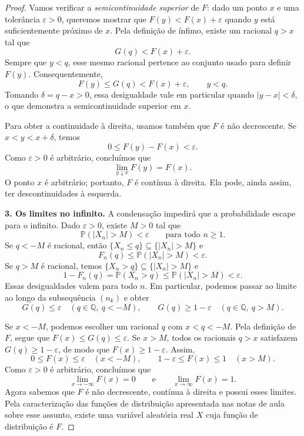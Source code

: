 \documentclass[12pt,portuguese]{article}
\theoremstyle{definition}
\theoremstyle{plainexercise}
\theoremstyle{starredexercise}
\theoremstyle{definition}
\begin{document}
\begin{proof}
\bigskip 

Vamos verificar a \emph{semicontinuidade superior} de $F$: dado um ponto $x$
e uma tolerância $\varepsilon>0$, queremos mostrar que
$F(y)<F(x)+\varepsilon$ quando $y$ está suficientemente próximo de $x$.
Pela definição de ínfimo, existe um racional $q>x$ tal que
\[
G(q)<F(x)+\varepsilon.
\]
Sempre que $y<q$, esse mesmo racional pertence ao conjunto usado para
definir $F(y)$. Consequentemente,
\[
F(y)\leqslant G(q)<F(x)+\varepsilon,\qquad y<q.
\]
Tomando $\delta=q-x>0$, essa desigualdade vale em particular quando
$|y-x|<\delta$, o que demonstra a semicontinuidade superior em $x$.

Para obter a continuidade à direita, usamos também que $F$ é não
decrescente. Se $x<y<x+\delta$, temos
\[
0\leqslant F(y)-F(x)<\varepsilon.
\]
Como $\varepsilon>0$ é arbitrário, concluímos que
\[
\lim_{y\downarrow x}F(y)=F(x).
\]
O ponto $x$ é arbitrário; portanto, $F$ é contínua à direita. Ela pode, ainda
assim, ter descontinuidades à esquerda.

\bigskip

\noindent\textbf{3. Os limites no infinito.}
A condensação impedirá que a probabilidade escape para o infinito. Dado
$\varepsilon>0$, existe $M>0$ tal que
\[
\mathbb{P}(|X_n|>M)<\varepsilon
\qquad\text{para todo }n\geqslant1.
\]
Se $q<-M$ é racional, então $\{X_n\leqslant q\}\subseteq\{|X_n|>M\}$ e
\[
F_n(q)\leqslant\mathbb{P}(|X_n|>M)<\varepsilon.
\]
Se $q>M$ é racional, temos $\{X_n>q\}\subseteq\{|X_n|>M\}$ e
\[
1-F_n(q)=\mathbb{P}(X_n>q)
\leqslant\mathbb{P}(|X_n|>M)<\varepsilon.
\]
Essas desigualdades valem para todo $n$. Em particular, podemos passar ao
limite ao longo da subsequência $(n_k)$ e obter
\[
G(q)\leqslant\varepsilon\quad(q\in\mathbb{Q},\ q<-M),
\qquad
G(q)\geqslant1-\varepsilon\quad(q\in\mathbb{Q},\ q>M).
\]

Se $x<-M$, podemos escolher um racional $q$ com $x<q<-M$. Pela definição de
$F$, segue que $F(x)\leqslant G(q)\leqslant\varepsilon$. Se $x>M$, todos os
racionais $q>x$ satisfazem $G(q)\geqslant1-\varepsilon$, de modo que
$F(x)\geqslant1-\varepsilon$. Assim,
\[
0\leqslant F(x)\leqslant\varepsilon\quad(x<-M),
\qquad
1-\varepsilon\leqslant F(x)\leqslant1\quad(x>M).
\]
Como $\varepsilon>0$ é arbitrário, concluímos que
\[
\lim_{x\to-\infty}F(x)=0
\qquad\text{e}\qquad
\lim_{x\to\infty}F(x)=1.
\]
Agora sabemos que $F$ é não decrescente, contínua à direita e possui esses
limites. Pela caracterização das funções de distribuição apresentada nas
notas de aula sobre esse assunto, existe uma variável aleatória real $X$ cuja
função de distribuição é $F$.


\end{proof}
\end{document}
